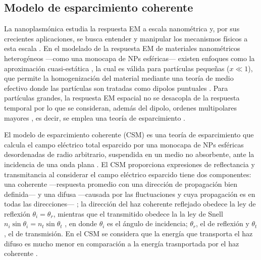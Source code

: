 \documentclass[letterpaper,11pt] {article}
\begin{document}
	\subsection{Modelo de esparcimiento coherente}

	La nanoplasmónica estudia la respuesta EM a escala nanométrica \cite{novotny2006principles} y, por sus crecientes aplicaciones, se busca entender y manipular los mecanismos físicos a esta escala \cite{sihvola2007dielectric}.  En el modelado de la respuesta EM de materiales nanométricos heterogéneos ---como una monocapa de NPs esféricas--- existen enfoques como la aproximación cuasi-estática \cite{sihvola1999mixing}, la cual es válida para partículas pequeñas ($x\ll 1$), que permite la homogenización del material mediante una teoría de medio efectivo donde las partículas son tratadas como dipolos puntuales \cite{sihvola1999mixing,pena-gomar2006coherent}.  Para partículas grandes, la respuesta EM espacial no se desacopla de la respuesta temporal por lo que se consideran, además del dipolo, ordenes multipolares mayores  \cite{sihvola1999mixing}, es decir, se emplea una teoría de esparcimiento 	 \cite{pena-gomar2006coherent}. 
	
	El modelo de esparcimiento coherente (CSM) es una teoría de  esparcimiento que calcula el campo eléctrico total esparcido por una monocapa de NPs  esféricas desordenadas de radio arbitrario, suspendida en un medio no absorbente, ante la incidencia de una onda plana \cite{reyes2018analytical}. 	El CSM proporciona expresiones de reflectancia y transmitancia al considerar el campo eléctrico esparcido tiene dos componentes: una coherente ---respuesta promedio con una dirección de propagación bien definida--- y una  difusa ---causada por las fluctuaciones y cuya propagación es en todas las direcciones--- \cite{reyes2018analytical}; la dirección del haz coherente reflejado obedece la ley de reflexión $\theta_i = \theta_r$, mientras que el transmitido obedece la la ley de Snell $n_i\sin\theta_i = n_t\sin\theta_t$ \cite{garcia2012multiple}, en donde $\theta_i$ es el ángulo de incidencia; $\theta_r$, el de reflexión y $\theta_t$, el de transmisión.  En el CSM se considera que la energía que transporta el haz difuso es mucho menor en comparación a la energía trasnportada por el haz coherente \cite{reyes2018analytical}.  
	
    
\end{document}
